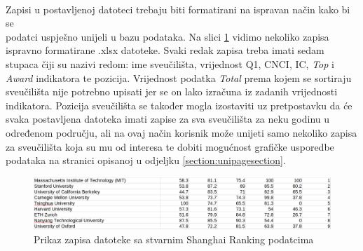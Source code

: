 \documentclass[times, utf8, zavrsni]{fer}
\begin{document}
\\Zapisi u postavljenoj datoteci trebaju biti formatirani na ispravan način kako bi se \\podatci uspješno unijeli u bazu podataka. 
Na slici \ref{fig:real} vidimo nekoliko zapisa ispravno formatirane .xlsx datoteke. Svaki redak zapisa treba imati sedam stupaca čiji su nazivi redom:
ime sveučilišta, vrijednost Q1, CNCI, IC, \emph{Top} i \emph{Award} indikatora te pozicija. Vrijednost podatka \emph{Total} prema kojem se sortiraju 
sveučilišta nije potrebno upisati jer se on lako izračuna iz zadanih vrijednosti indikatora. Pozicija sveučilišta se također mogla
izostaviti uz pretpostavku da će svaka postavljena datoteka imati zapise za sva sveučilišta za neku godinu u određenom području, ali
na ovaj način korisnik može unijeti samo nekoliko zapisa za sveučilišta koja su mu od interesa te dobiti mogućnost 
grafičke usporedbe podataka na stranici opisanoj u odjeljku \ref{section:unipagesection}.
\begin{figure}[htb]
    \hspace*{-2cm} 
       \includegraphics[scale=0.3]{real.png} 
       \caption{Prikaz zapisa datoteke sa stvarnim Shanghai Ranking podatcima}
       \label{fig:real}
       \end{figure}  
\end{document}
